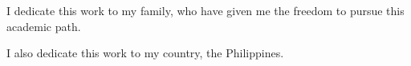 
I dedicate this work to my family, who have given me the freedom to pursue this academic path.

I also dedicate this work to my country, the Philippines. 